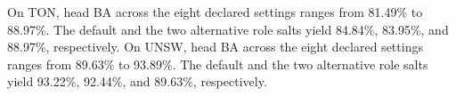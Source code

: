 On TON, head BA across the eight declared settings ranges from 81.49\% to 88.97\%. The default and the two alternative role salts yield 84.84\%, 83.95\%, and 88.97\%, respectively. On UNSW, head BA across the eight declared settings ranges from 89.63\% to 93.89\%. The default and the two alternative role salts yield 93.22\%, 92.44\%, and 89.63\%, respectively.
